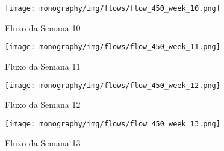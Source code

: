 \begin{figure}[htbp]
    \centering
    \texttt{[image: monography/img/flows/flow\_450\_week\_10.png]}
    \label{figure:flow_450_week_10}
    \caption{Fluxo da Semana 10}
\end{figure}

\begin{figure}[htbp]
    \centering
    \texttt{[image: monography/img/flows/flow\_450\_week\_11.png]}
    \label{figure:flow_450_week_11}
    \caption{Fluxo da Semana 11}
\end{figure}

\begin{figure}[htbp]
    \centering
    \texttt{[image: monography/img/flows/flow\_450\_week\_12.png]}
    \label{figure:flow_450_week_12}
    \caption{Fluxo da Semana 12}
\end{figure}

\begin{figure}[htbp]
    \centering
    \texttt{[image: monography/img/flows/flow\_450\_week\_13.png]}
    \label{figure:flow_450_week_13}
    \caption{Fluxo da Semana 13}
\end{figure}